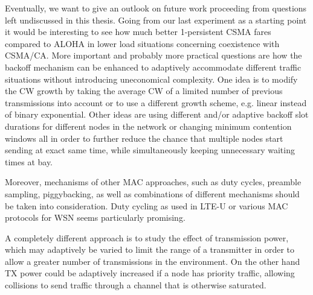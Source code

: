 Eventually, we want to give an outlook on future work proceeding from questions left undiscussed in this thesis. Going from our last experiment as a starting point it would be interesting to see how much better 1-persistent CSMA fares compared to ALOHA in lower load situations concerning coexistence with CSMA/CA. More important and probably more practical questions are how the backoff mechanism can be enhanced to adaptively accommodate different traffic situations without introducing uneconomical complexity. One idea is to modify the CW growth by taking the average CW of a limited number of previous transmissions into account or to use a different growth scheme, e.g. linear instead of binary exponential. Other ideas are using different and/or adaptive backoff slot durations for different nodes in the network or changing minimum contention windows all in order to further reduce the chance that multiple nodes start sending at exact same time, while simultaneously keeping unnecessary waiting times at bay. 

Moreover, mechanisms of other MAC approaches, such as duty cycles, preamble sampling, piggybacking, as well as combinations of different mechanisms should be taken into consideration. Duty cycling as used in LTE-U or various MAC protocols for WSN seems particularly promising. 

A completely different approach is to study the effect of transmission power, which may adaptively be varied to limit the range of a transmitter in order to allow a greater number of transmissions in the environment. On the other hand TX power could be adaptively increased if a node has priority traffic, allowing collisions to send traffic through a channel that is otherwise saturated. 
